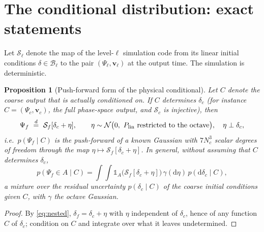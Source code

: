 \documentclass[11pt]{article}
\newtheorem{proposition}{Proposition}[section]
\theoremstyle{definition}
\newcommand{\Psic}{\Psi_{c}}
\newcommand{\Psif}{\Psi_{f}}
\newcommand{\dd}{\mathrm{d}}
\newcommand{\lin}{{\rm lin}}
\newcommand{\Nbody}{\mathcal{S}}
\begin{document}
\section{The conditional distribution: exact statements}\label{sec:push}

Let $\Nbody_\ell$ denote the map of the level-$\ell$ simulation code from its linear initial conditions $\delta\in\mathcal B_\ell$ to the pair $(\Psi_\ell,\mathbf v_\ell)$ at the output time. The simulation is deterministic.

\begin{proposition}[Push-forward form of the physical conditional]\label{prop:push}
Let $C$ denote the coarse output that is actually conditioned on. If $C$ determines $\delta_c$ (for instance $C=(\Psic,\mathbf v_c)$, the full phase-space output, and $\Nbody_c$ is injective), then
\begin{equation}
\Psif\ \overset{d}{=}\ \Nbody_f[\delta_c+\eta],\qquad \eta\sim\mathcal N\big(0,\ P_\lin\ \text{restricted to the octave}\big),\quad \eta\perp\delta_c ,
\end{equation}
i.e.\ $p(\Psif\mid C)$ is the push-forward of a known Gaussian with $7N_c^3$ scalar degrees of freedom through the map $\eta\mapsto\Nbody_f[\delta_c+\eta]$. In general, without assuming that $C$ determines $\delta_c$,
\begin{equation}
p(\Psif\in A\mid C)=\int\!\!\int\mathbb 1_A\big(\Nbody_f[\delta_c+\eta]\big)\,\gamma(\dd\eta)\,p(\dd\delta_c\mid C),
\label{eq:mixture}
\end{equation}
a mixture over the residual uncertainty $p(\delta_c\mid C)$ of the coarse initial conditions given $C$, with $\gamma$ the octave Gaussian.
\end{proposition}
\begin{proof}
By \eqref{eq:nested}, $\delta_f=\delta_c+\eta$ with $\eta$ independent of $\delta_c$, hence of any function $C$ of $\delta_c$; condition on $C$ and integrate over what it leaves undetermined.
\end{proof}
\end{document}
